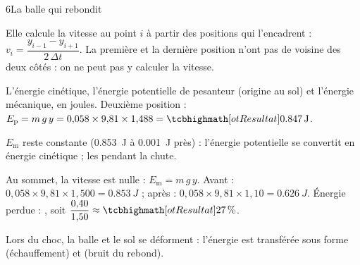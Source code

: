 \begin{corrigeBac}{6}{La balle qui rebondit}
\begin{questions}
\item Elle calcule la vitesse au point $i$ à partir des positions qui l'encadrent : $v_i=\dfrac{y_{i-1}-y_{i+1}}{2\,\Delta t}$. La première et la dernière
position n'ont pas de voisine des deux côtés : on ne peut pas y calculer la vitesse. 
\item L'énergie cinétique, l'énergie potentielle de pesanteur (origine au sol) et l'énergie mécanique, en joules. Deuxième
position : $E_\mathrm{p}=m\,g\,y=0{,}058\times9{,}81\times1{,}488=\res{\qty{0,847}{J}}$. \pts{1 pt}
\item $E_\mathrm{m}$ reste constante (\qty{0,853}{J} à \qty{0,001}{J} près) : l'énergie potentielle se convertit en énergie cinétique ; les
 pendant la chute. \pts{1 pt}
\item Au sommet, la vitesse est nulle : $E_\mathrm{m}=m\,g\,y$. Avant : $0{,}058\times9{,}81\times1{,}500=\qty{0,853}{J}$ ; après : $0{,}058\times9{,}81\times1{,}10=\qty{0,626}{J}$.
Énergie perdue : , soit $\dfrac{0{,}40}{1{,}50}\approx\res{\qty{27}{\percent}}$. 
\item Lors du choc, la balle et le sol se déforment : l'énergie est transférée sous forme  (échauffement) et
 (bruit du rebond). \pts{1 pt}
\end{questions}
\end{corrigeBac}
